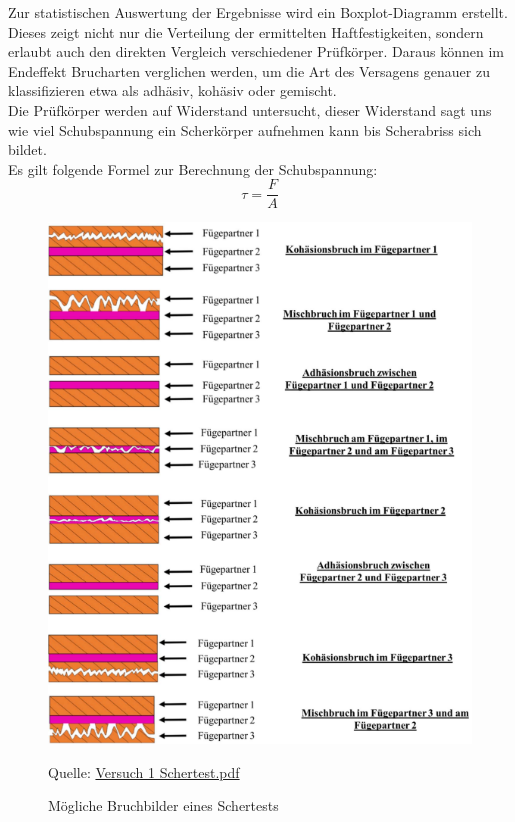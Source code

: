 Zur statistischen Auswertung der Ergebnisse wird ein Boxplot-Diagramm erstellt. Dieses zeigt nicht nur die Verteilung der ermittelten Haftfestigkeiten, sondern erlaubt auch den direkten Vergleich verschiedener Prüfkörper. Daraus können im Endeffekt Brucharten verglichen werden, um die Art des Versagens genauer zu klassifizieren etwa als adhäsiv, kohäsiv oder gemischt.\\
Die Prüfkörper werden auf Widerstand untersucht, dieser Widerstand sagt uns wie viel Schubspannung ein Scherkörper aufnehmen kann bis Scherabriss sich bildet.\\
Es gilt folgende Formel zur Berechnung der Schubspannung:\\
\begin{equation}
    \tau = \frac{F}{A}
\end{equation}   
\vspace{0.2cm}
\begin{figure}
    \centering
    \includegraphics[scale=0.4]{Bilder/Brucharten.png}
    \caption{Mögliche Bruchbilder eines Schertests}
    \par Quelle: \href{https://learn.fh-kiel.de/mod/folder/view.php?id=160797}{Versuch 1 Schertest.pdf}
    \vspace{0.2cm}
    \label{Abb.3: Mögliche Bruchbilder eines Schertests}
\end{figure}
\\
